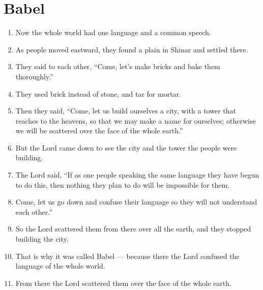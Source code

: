 \documentclass{article}
\begin{document}
\tableofcontents
\newpage

\section{Babel}

\begin{multicols}{2}

\begin{enumerate}
\item Now the whole world had one language and a common speech.  
\item As people moved eastward, they found a plain in Shinar and settled there.


\item They said to each other, ``Come, let’s make bricks and bake them thoroughly.'' 
\item They used brick instead of stone, and tar for mortar.  
\item Then they said, ``Come, let us build ourselves a city, with a tower that reaches to the heavens, so that we may make a name for ourselves; otherwise we will be scattered over the face of the whole earth.''






\item But the Lord came down to see the city and the tower the people were building. 
\item The Lord said, ``If as one people speaking the same language they have begun to do this, then nothing they plan to do will be impossible for them.  
\item Come, let us go down and confuse their language so they will not understand each other.''





 \item So the Lord scattered them from there over all the earth, and they stopped building the city. 
 \item That is why it was called Babel --- because there the Lord confused the language of the whole world. 
 \item From there the Lord scattered them over the face of the whole earth.



\end{enumerate}
\end{multicols}
\end{document}
